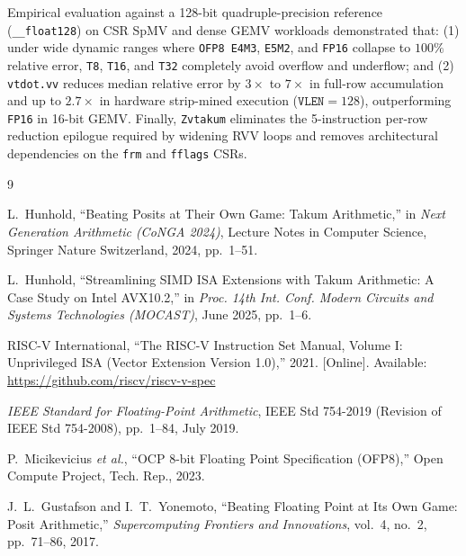 \documentclass[conference]{IEEEtran}
\begin{document}
Empirical evaluation against a 128-bit quadruple-precision reference (\texttt{\_\_float128}) on CSR SpMV and dense GEMV workloads demonstrated that: (1) under wide dynamic ranges where \texttt{OFP8 E4M3}, \texttt{E5M2}, and \texttt{FP16} collapse to $100\%$ relative error, \texttt{T8}, \texttt{T16}, and \texttt{T32} completely avoid overflow and underflow; and (2) \texttt{vtdot.vv} reduces median relative error by $3\times$ to $7\times$ in full-row accumulation and up to $2.7\times$ in hardware strip-mined execution ($\texttt{VLEN}=128$), outperforming \texttt{FP16} in 16-bit GEMV. Finally, \texttt{Zvtakum} eliminates the 5-instruction per-row reduction epilogue required by widening RVV loops and removes architectural dependencies on the \texttt{frm} and \texttt{fflags} CSRs.

\begin{thebibliography}{9}

L.~Hunhold, ``Beating Posits at Their Own Game: Takum Arithmetic,'' in \emph{Next Generation Arithmetic (CoNGA 2024)}, Lecture Notes in Computer Science, Springer Nature Switzerland, 2024, pp.~1--51.

L.~Hunhold, ``Streamlining SIMD ISA Extensions with Takum Arithmetic: A Case Study on Intel AVX10.2,'' in \emph{Proc. 14th Int. Conf. Modern Circuits and Systems Technologies (MOCAST)}, June 2025, pp.~1--6.

RISC-V International, ``The RISC-V Instruction Set Manual, Volume I: Unprivileged ISA (Vector Extension Version 1.0),'' 2021. [Online]. Available: \url{https://github.com/riscv/riscv-v-spec}

\emph{IEEE Standard for Floating-Point Arithmetic}, IEEE Std 754-2019 (Revision of IEEE Std 754-2008), pp.~1--84, July 2019.

P.~Micikevicius \emph{et al.}, ``OCP 8-bit Floating Point Specification (OFP8),'' Open Compute Project, Tech. Rep., 2023.

J.~L.~Gustafson and I.~T.~Yonemoto, ``Beating Floating Point at Its Own Game: Posit Arithmetic,'' \emph{Supercomputing Frontiers and Innovations}, vol.~4, no.~2, pp.~71--86, 2017.

\end{thebibliography}
\end{document}
